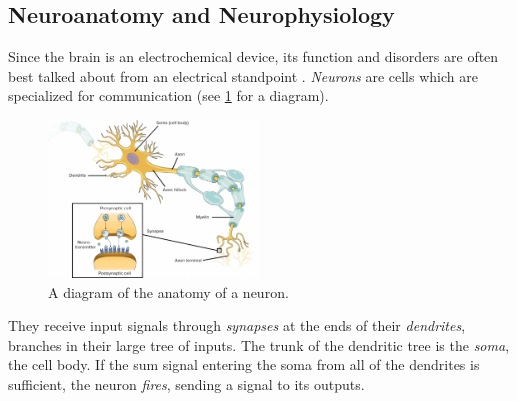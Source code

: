 \subsection{Neuroanatomy and Neurophysiology}
\label{sec:intro_seizures_neuroanatomy}
Since the brain is an electrochemical device, its function and disorders are often best talked about from an electrical standpoint \cite{Deco2008}.
\textit{Neurons} are cells which are specialized for communication (see \cref{fig:neuron_diagram} for a diagram).
\begin{figure}[ht]
  \centering
  \includegraphics[width=0.5\textwidth]{figure/neuron_diagram}
  \caption[Neuron diagram]{A diagram of the anatomy of a neuron.}
  \label{fig:neuron_diagram}
\end{figure}
They receive input signals through \textit{synapses} at the ends of their \textit{dendrites}, branches in their large tree of inputs.
The trunk of the dendritic tree is the \textit{soma}, the cell body.
If the sum signal entering the soma from all of the dendrites is sufficient, the neuron \textit{fires}, sending a signal to its outputs.

